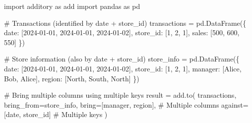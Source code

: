 \documentclass[
  letterpaper,
]{scrbook}
\newenvironment{Shaded}{\begin{snugshade}}{\end{snugshade}}
\newcommand{\CommentTok}[1]{\textcolor[rgb]{0.37,0.37,0.37}{#1}}
\newcommand{\DecValTok}[1]{\textcolor[rgb]{0.68,0.00,0.00}{#1}}
\newcommand{\ImportTok}[1]{\textcolor[rgb]{0.00,0.46,0.62}{#1}}
\newcommand{\NormalTok}[1]{\textcolor[rgb]{0.00,0.23,0.31}{#1}}
\newcommand{\OperatorTok}[1]{\textcolor[rgb]{0.37,0.37,0.37}{#1}}
\newcommand{\StringTok}[1]{\textcolor[rgb]{0.13,0.47,0.30}{#1}}
\begin{document}
\begin{Shaded}
\begin{Highlighting}[]
\ImportTok{import}\NormalTok{ additory }\ImportTok{as}\NormalTok{ add}
\ImportTok{import}\NormalTok{ pandas }\ImportTok{as}\NormalTok{ pd}

\CommentTok{\# Transactions (identified by date + store\_id)}
\NormalTok{transactions }\OperatorTok{=}\NormalTok{ pd.DataFrame(\{}
    \StringTok{\textquotesingle{}date\textquotesingle{}}\NormalTok{: [}\StringTok{\textquotesingle{}2024{-}01{-}01\textquotesingle{}}\NormalTok{, }\StringTok{\textquotesingle{}2024{-}01{-}01\textquotesingle{}}\NormalTok{, }\StringTok{\textquotesingle{}2024{-}01{-}02\textquotesingle{}}\NormalTok{],}
    \StringTok{\textquotesingle{}store\_id\textquotesingle{}}\NormalTok{: [}\DecValTok{1}\NormalTok{, }\DecValTok{2}\NormalTok{, }\DecValTok{1}\NormalTok{],}
    \StringTok{\textquotesingle{}sales\textquotesingle{}}\NormalTok{: [}\DecValTok{500}\NormalTok{, }\DecValTok{600}\NormalTok{, }\DecValTok{550}\NormalTok{]}
\NormalTok{\})}

\CommentTok{\# Store information (also by date + store\_id)}
\NormalTok{store\_info }\OperatorTok{=}\NormalTok{ pd.DataFrame(\{}
    \StringTok{\textquotesingle{}date\textquotesingle{}}\NormalTok{: [}\StringTok{\textquotesingle{}2024{-}01{-}01\textquotesingle{}}\NormalTok{, }\StringTok{\textquotesingle{}2024{-}01{-}01\textquotesingle{}}\NormalTok{, }\StringTok{\textquotesingle{}2024{-}01{-}02\textquotesingle{}}\NormalTok{],}
    \StringTok{\textquotesingle{}store\_id\textquotesingle{}}\NormalTok{: [}\DecValTok{1}\NormalTok{, }\DecValTok{2}\NormalTok{, }\DecValTok{1}\NormalTok{],}
    \StringTok{\textquotesingle{}manager\textquotesingle{}}\NormalTok{: [}\StringTok{\textquotesingle{}Alice\textquotesingle{}}\NormalTok{, }\StringTok{\textquotesingle{}Bob\textquotesingle{}}\NormalTok{, }\StringTok{\textquotesingle{}Alice\textquotesingle{}}\NormalTok{],}
    \StringTok{\textquotesingle{}region\textquotesingle{}}\NormalTok{: [}\StringTok{\textquotesingle{}North\textquotesingle{}}\NormalTok{, }\StringTok{\textquotesingle{}South\textquotesingle{}}\NormalTok{, }\StringTok{\textquotesingle{}North\textquotesingle{}}\NormalTok{]}
\NormalTok{\})}

\CommentTok{\# Bring multiple columns using multiple keys}
\NormalTok{result }\OperatorTok{=}\NormalTok{ add.to(}
\NormalTok{    transactions,}
\NormalTok{    bring\_from}\OperatorTok{=}\NormalTok{store\_info,}
\NormalTok{    bring}\OperatorTok{=}\NormalTok{[}\StringTok{\textquotesingle{}manager\textquotesingle{}}\NormalTok{, }\StringTok{\textquotesingle{}region\textquotesingle{}}\NormalTok{],        }\CommentTok{\# Multiple columns}
\NormalTok{    against}\OperatorTok{=}\NormalTok{[}\StringTok{\textquotesingle{}date\textquotesingle{}}\NormalTok{, }\StringTok{\textquotesingle{}store\_id\textquotesingle{}}\NormalTok{]        }\CommentTok{\# Multiple keys}
\NormalTok{)}


\end{Highlighting}
\end{Shaded}
\end{document}
